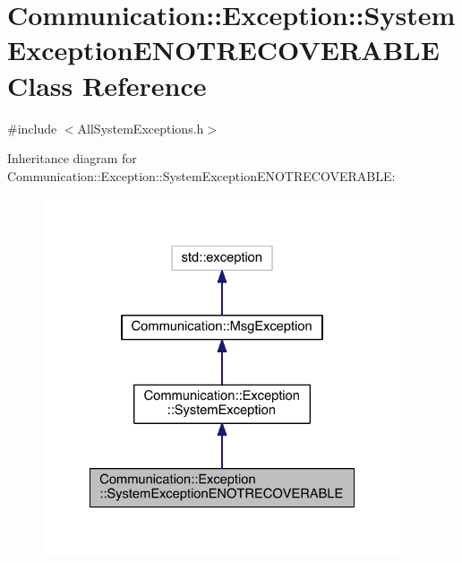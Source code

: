 \hypertarget{class_communication_1_1_exception_1_1_system_exception_e_n_o_t_r_e_c_o_v_e_r_a_b_l_e}{}\section{Communication\+:\+:Exception\+:\+:System\+Exception\+E\+N\+O\+T\+R\+E\+C\+O\+V\+E\+R\+A\+B\+L\+E Class Reference}
\label{class_communication_1_1_exception_1_1_system_exception_e_n_o_t_r_e_c_o_v_e_r_a_b_l_e}


{\ttfamily \#include $<$All\+System\+Exceptions.\+h$>$}



Inheritance diagram for Communication\+:\+:Exception\+:\+:System\+Exception\+E\+N\+O\+T\+R\+E\+C\+O\+V\+E\+R\+A\+B\+L\+E\+:\nopagebreak
\begin{figure}[H]
\begin{center}
\leavevmode
\includegraphics[width=300pt]{class_communication_1_1_exception_1_1_system_exception_e_n_o_t_r_e_c_o_v_e_r_a_b_l_e__inherit__graph}
\end{center}
\end{figure}


